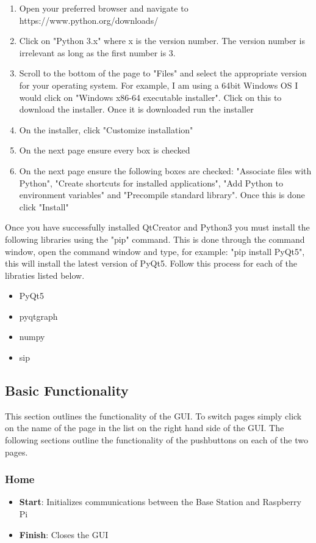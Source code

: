 \begin{enumerate}
	\item Open your preferred browser and navigate to https://www.python.org/downloads/
	\item Click on "Python 3.x" where x is the version number. The version number is irrelevant as long as the first number is 3. 
	\item Scroll to the bottom of the page to "Files" and select the appropriate version for your operating system. For example, I am using a 64bit Windows OS I would click on "Windows x86-64 executable installer". Click on this to download the installer. Once it is downloaded run the installer
	\item On the installer, click "Customize installation"
	\item On the next page ensure every box is checked
	\item On the next page ensure the following boxes are checked: "Associate files with Python", "Create shortcuts for installed applications", "Add Python to environment variables" and "Precompile standard library". Once this is done click "Install"
\end{enumerate}

Once you have successfully installed QtCreator and Python3 you must install the following libraries using the "pip" command. This is done through the command window, open the command window and type, for example: "pip install PyQt5", this will install the latest version of PyQt5. Follow this process for each of the libraties listed below.

\begin{itemize}
	\item PyQt5
	\item pyqtgraph
	\item numpy
	\item sip
\end{itemize}

\subsection{Basic Functionality}
This section outlines the functionality of the GUI. To switch pages simply click on the name of the page in the list on the right hand side of the GUI. The following sections outline the functionality of the pushbuttons on each of the two pages.

\subsubsection{Home}
\begin{itemize}
	\item \textbf{Start}: Initializes communications between the Base Station and Raspberry Pi
	\item \textbf{Finish}: Closes the GUI
\end{itemize}

